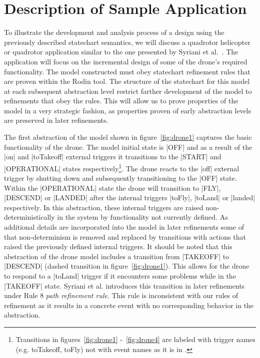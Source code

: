 

\section{Description of Sample Application}
To illustrate the development and analysis process of a design using the previously described 
statechart semantics, we will discuss a quadrotor helicopter or quadrotor application similar to 
the one presented by Syriani et al.~\cite{Syriani_2019}. The application will focus on the incremental 
design of some of the drone's required functionality.
The model constructed must obey statechart refinement rules that are proven within the Rodin tool.
The structure of the statechart for this model at each subsequent abstraction level restrict farther 
development of the model to refinements that obey the rules. This will allow us to prove properties 
of the model in a very strategic fashion, as properties proven of early abstraction levels 
are preserved in later refinements.

The first abstraction of the model shown in figure~\ref{fig:drone1} captures the basic 
functionality of the drone. The model initial state is |OFF| and as a result of the |on| and 
|toTakeoff| external triggers it transitions to the |START| and |OPERATIONAL| states 
respectively\footnote{Transitions in figures~\ref{fig:drone1} -~\ref{fig:drone4} are labeled with trigger names
(e.g. toTakeoff, toFly) not with event names as it is in \UMLB.}. 
The drone reacts to the |off| external trigger by shutting down and subsequently transitioning to the |OFF| state.
Within the |OPERATIONAL| state the drone will transition to |FLY|, |DESCEND| or |LANDED| 
after the internal triggers |toFly|, |toLand| or |landed| respectively. 
In this abstraction, these internal triggers are raised non-deterministically 
in the system by functionality not currently defined.
As additional details are incorporated into the model in later refinements some of that non-determinism is 
removed and replaced by transitions with actions that raised the previously defined internal triggers.
It should be noted that this abstraction of the drone model includes a transition 
from |TAKEOFF| to |DESCEND| (dashed transition in figure~\ref{fig:drone1}). 
This allows for the drone to respond to a |toLand| trigger if it encounters some 
problems while in the |TAKEOFF| state. Syriani et al. introduces this transition 
in later refinements under Rule 8 \emph{path refinement rule}. This rule is inconsistent with our rules 
of refinement as it results in a concrete event with no corresponding 
behavior in the abstraction.

